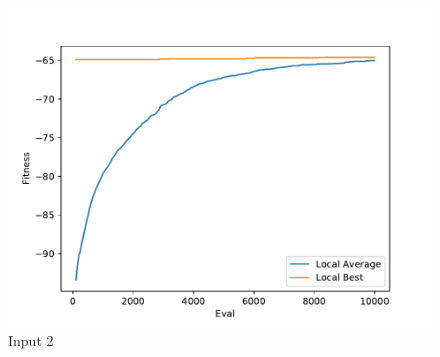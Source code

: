 \documentclass{standalone}
\begin{document}
\begin{figure}[!htb]
	\caption{Input 2}
	\label{fig:graph_2027}
	\includegraphics[width=\textwidth]{../graphs/graphs/2027.pdf}
\end{figure}
\end{document}
